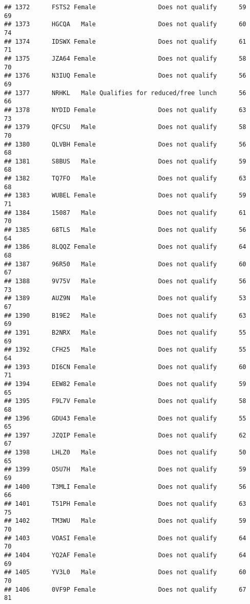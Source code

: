 \documentclass[
]{article}
\begin{document}
\begin{verbatim}
## 1372      FSTS2 Female                 Does not qualify      59       69
## 1373      HGCQA   Male                 Does not qualify      60       74
## 1374      IDSWX Female                 Does not qualify      61       71
## 1375      JZA64 Female                 Does not qualify      58       70
## 1376      N3IUQ Female                 Does not qualify      56       69
## 1377      NRHKL   Male Qualifies for reduced/free lunch      56       66
## 1378      NYDID Female                 Does not qualify      63       73
## 1379      QFCSU   Male                 Does not qualify      58       70
## 1380      QLVBH Female                 Does not qualify      56       68
## 1381      S8BUS   Male                 Does not qualify      59       68
## 1382      TQ7FO   Male                 Does not qualify      63       68
## 1383      WUBEL Female                 Does not qualify      59       71
## 1384      15087   Male                 Does not qualify      61       70
## 1385      68TLS   Male                 Does not qualify      56       64
## 1386      8LQQZ Female                 Does not qualify      64       68
## 1387      96R50   Male                 Does not qualify      60       67
## 1388      9V75V   Male                 Does not qualify      56       73
## 1389      AUZ9N   Male                 Does not qualify      53       67
## 1390      B19E2   Male                 Does not qualify      63       69
## 1391      B2NRX   Male                 Does not qualify      55       69
## 1392      CFH25   Male                 Does not qualify      55       64
## 1393      DI6CN Female                 Does not qualify      60       71
## 1394      EEW82 Female                 Does not qualify      59       65
## 1395      F9L7V Female                 Does not qualify      58       68
## 1396      GDU43 Female                 Does not qualify      55       65
## 1397      JZQIP Female                 Does not qualify      62       67
## 1398      LHLZ0   Male                 Does not qualify      50       65
## 1399      O5U7H   Male                 Does not qualify      59       69
## 1400      T3MLI Female                 Does not qualify      56       66
## 1401      T51PH Female                 Does not qualify      63       75
## 1402      TM3WU   Male                 Does not qualify      59       70
## 1403      VOASI Female                 Does not qualify      64       70
## 1404      YQ2AF Female                 Does not qualify      64       69
## 1405      YV3L0   Male                 Does not qualify      60       70
## 1406      0VF9P Female                 Does not qualify      67       81

\end{verbatim}
\end{document}
